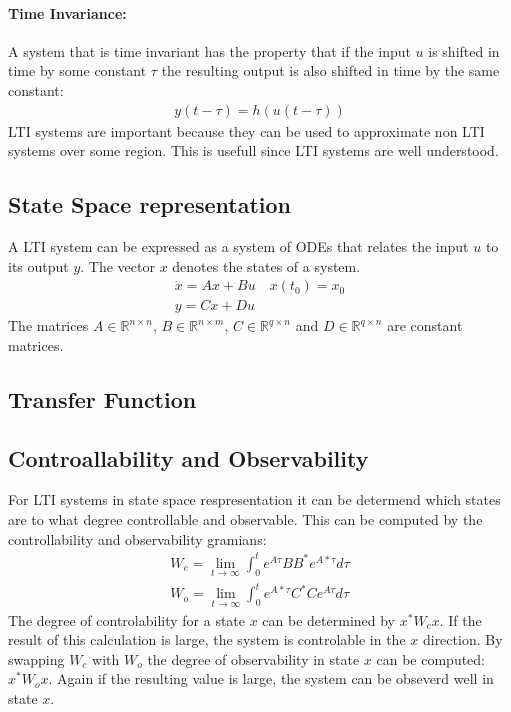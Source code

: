 \paragraph{Time Invariance:}
A system that is time invariant has the property that if the input \(u\) is shifted in time by some constant \(\tau\) the resulting output is also shifted in time by the same constant:
\begin{gather}
y(t - \tau) = h(u(t-\tau))
\end{gather}
LTI systems are important because they can be used to approximate non LTI systems over some region.
This is usefull since LTI systems are well understood.
\cite{DouglasB}
\subsection{State Space representation}
A LTI system can be expressed as a system of ODEs that relates the input \(u\) to its output \(y\).
The vector \(x\) denotes the states of a system.
\begin{gather}
\dot{x} = Ax + Bu \quad x(t_0) = x_0\\
y = Cx + Du
\end{gather}
The matrices \(A \in \mathbb{R}^{n \times n}\),
\(B \in \mathbb{R}^{n \times m}\),
\(C \in \mathbb{R}^{q \times n}\) and
\(D \in \mathbb{R}^{q \times n}\) are constant matrices.
\cite{BennerGrivet}
\subsection{Transfer Function}

\subsection{Controallability and Observability}
For LTI systems in state space respresentation it can be determend which states are to what degree controllable and observable.
This can be computed by the controllability and observability gramians:
\begin{gather}
W_c = \lim_{t \to \infty} \int_{0}^{t} e^{A\tau}BB^{*}e^{A*\tau}d\tau \label{gram-ctrl}\\
W_o = \lim_{t \to \infty} \int_{0}^{t} e^{A*\tau}C^{*}Ce^{A\tau}d\tau \label{gram-obsv}
\end{gather}
The degree of controlability for a state \(x\) can be determined by \(x^{*}W_cx\).
If the result of this calculation is large, the system is controlable in the \(x\) direction.
By swapping \(W_c\) with \(W_o\) the degree of observability in state \(x\) can be computed: \(x^{*}W_ox\).
Again if the resulting value is large, the system can be obseverd well in state \(x\).
\cite{brunton_kutz_2019d}